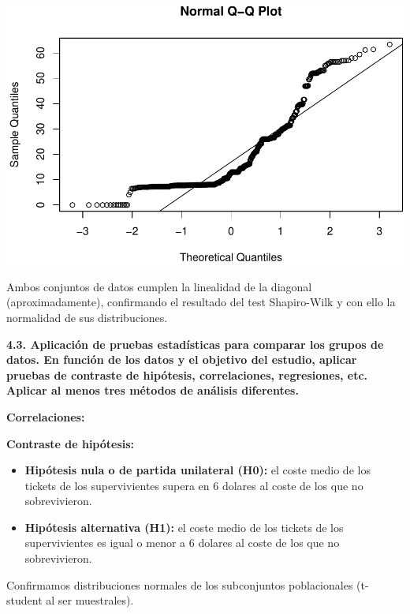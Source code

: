 \documentclass[]{article}
\newenvironment{Shaded}{\begin{snugshade}}{\end{snugshade}}
\newcommand{\DecValTok}[1]{\textcolor[rgb]{0.00,0.00,0.81}{#1}}
\newcommand{\FloatTok}[1]{\textcolor[rgb]{0.00,0.00,0.81}{#1}}
\newcommand{\KeywordTok}[1]{\textcolor[rgb]{0.13,0.29,0.53}{\textbf{#1}}}
\newcommand{\NormalTok}[1]{#1}
\newcommand{\OperatorTok}[1]{\textcolor[rgb]{0.81,0.36,0.00}{\textbf{#1}}}
\newcommand{\StringTok}[1]{\textcolor[rgb]{0.31,0.60,0.02}{#1}}
\begin{document}
\includegraphics{titanic_data_analysis_PRA2_files/figure-latex/unnamed-chunk-20-1.pdf}

Ambos conjuntos de datos cumplen la linealidad de la diagonal
(aproximadamente), confirmando el resultado del test Shapiro-Wilk y con
ello la normalidad de sus distribuciones.

\textbf{4.3. Aplicación de pruebas estadísticas para comparar los grupos
de datos. En función de los datos y el objetivo del estudio, aplicar
pruebas de contraste de hipótesis, correlaciones, regresiones, etc.
Aplicar al menos tres métodos de análisis diferentes.}

\textbf{Correlaciones:}

\textbf{Contraste de hipótesis:}

\begin{itemize}
\item
  \textbf{Hipótesis nula o de partida unilateral (H0):} el coste medio
  de los tickets de los supervivientes supera en 6 dolares al coste de
  los que no sobrevivieron.
\item
  \textbf{Hipótesis alternativa (H1):} el coste medio de los tickets de
  los supervivientes es igual o menor a 6 dolares al coste de los que no
  sobrevivieron.
\end{itemize}

Confirmamos distribuciones normales de los subconjuntos poblacionales
(t-student al ser muestrales).

\begin{Shaded}
\end{Shaded}
\end{document}
